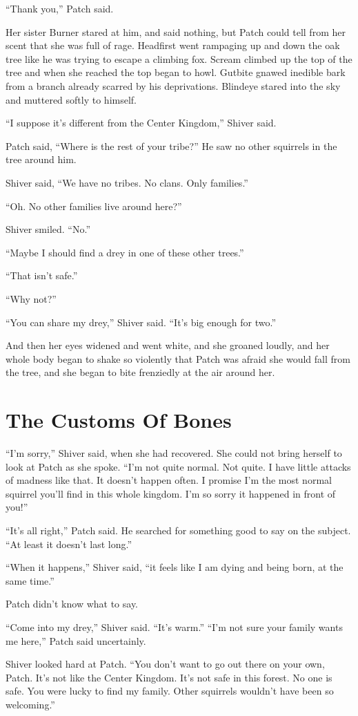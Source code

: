 \documentclass[ebook,oneside,openany,17pt]{memoir}
\renewcommand{\thechapter}{\Roman{chapter}}
\newcounter{sections}
\newcommand{\sections}[1]{%
  \section*{#1}
  \addtocounter{sections}{1}%
  \pdfbookmark[1]{#1}{section.\thechapter.\thesections}}
\begin{document}
“Thank you,” Patch said.

Her sister Burner stared at him, and said nothing, but Patch could
tell from her scent that she was full of rage. Headfirst went
rampaging up and down the oak tree like he was trying to escape a
climbing fox. Scream climbed up the top of the tree and when she
reached the top began to howl. Gutbite gnawed inedible bark from a
branch already scarred by his deprivations. Blindeye stared into the
sky and muttered softly to himself.

“I suppose it’s different from the Center Kingdom,” Shiver said.

Patch said, “Where is the rest of your tribe?” He saw no other
squirrels in the tree around him.

Shiver said, “We have no tribes. No clans. Only families.”

“Oh. No other families live around here?”

Shiver smiled. “No.”

“Maybe I should find a drey in one of these other trees.”

“That isn’t safe.”

“Why not?”

“You can share my drey,” Shiver said. “It’s big enough for two.”

And then her eyes widened and went white, and she groaned loudly, and
her whole body began to shake so violently that Patch was afraid she
would fall from the tree, and she began to bite frenziedly at the air
around her.


\sections{The Customs Of Bones}

“I’m sorry,” Shiver said, when she had recovered. She could not bring
herself to look at Patch as she spoke. “I’m not quite normal. Not
quite. I have little attacks of madness like that. It doesn’t happen
often. I promise I’m the most normal squirrel you’ll find in this
whole kingdom. I’m so sorry it happened in front of you!”

“It’s all right,” Patch said. He searched for something good to say on
the subject. “At least it doesn’t last long.”

“When it happens,” Shiver said, “it feels like I am dying and being
born, at the same time.”

Patch didn’t know what to say.

“Come into my drey,” Shiver said. “It’s warm.” “I’m not sure your
family wants me here,” Patch said uncertainly.

Shiver looked hard at Patch. “You don’t want to go out there on your
own, Patch. It’s not like the Center Kingdom. It’s not safe in this
forest. No one is safe. You were lucky to find my family. Other
squirrels wouldn’t have been so welcoming.”
\end{document}
